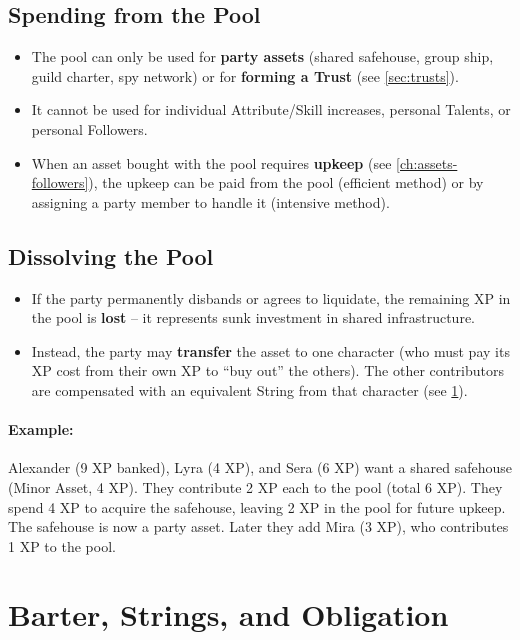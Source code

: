 \subsection{Spending from the Pool}
\label{subsec:spending-pool}

\begin{itemize}
  \item The pool can only be used for \textbf{party assets} (shared safehouse, group ship, guild charter, spy network) or for \textbf{forming a Trust} (see \ref{sec:trusts}).
  \item It cannot be used for individual Attribute/Skill increases, personal Talents, or personal Followers.
  \item When an asset bought with the pool requires \textbf{upkeep} (see \ref{ch:assets-followers}), the upkeep can be paid from the pool (efficient method) or by assigning a party member to handle it (intensive method).
\end{itemize}

\subsection{Dissolving the Pool}
\label{subsec:dissolving-pool}

\begin{itemize}
  \item If the party permanently disbands or agrees to liquidate, the remaining XP in the pool is \textbf{lost} -- it represents sunk investment in shared infrastructure.
  \item Instead, the party may \textbf{transfer} the asset to one character (who must pay its XP cost from their own XP to ``buy out'' the others). The other contributors are compensated with an equivalent String from that character (see \ref{sec:barter-strings-obligation}).
\end{itemize}

\paragraph{Example:} Alexander (9 XP banked), Lyra (4 XP), and Sera (6 XP) want a shared safehouse (Minor Asset, 4 XP). They contribute 2 XP each to the pool (total 6 XP). They spend 4 XP to acquire the safehouse, leaving 2 XP in the pool for future upkeep. The safehouse is now a party asset. Later they add Mira (3 XP), who contributes 1 XP to the pool.

\section{Barter, Strings, and Obligation}
\label{sec:barter-strings-obligation}

